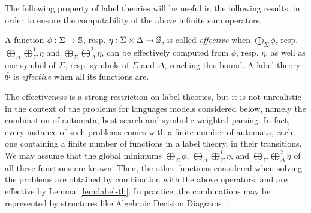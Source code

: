 



\noindent 
The following property of label theories will be useful in 
the following results, in order to ensure 
the computability of the above infinite sum operators.
%
\begin{definition}\label{def:effective}
A function $\phi: \Sigma \to \mathbb{S}$, 
resp. $\eta: \Sigma \times \Delta \to \mathbb{S}$,
is called \emph{effective} when 
$\bigoplus_{\Sigma} \phi$,
resp. $\bigoplus_{\Delta}\bigoplus^1_{\Sigma} \eta$ and $\bigoplus_{\Sigma}\bigoplus^2_{\Delta} \eta$,
can be effectively computed from $\phi$, resp. $\eta$, 
as well as one symbol of $\Sigma$, resp. symbols of $\Sigma$ and $\Delta$, 
reaching this bound.
%
A label theory $\bar\Phi$ is \emph{effective} when all its functions are.
\end{definition}

The effectiveness is a strong restriction on label theories, but it is
not unrealistic in the context of the problems for languages models considered below, 
namely the combination of automata, best-search and symbolic weighted parsing.
%
In fact, every instance of such problems comes with a finite number of automata, 
each one containing a finite number of functions in a label theory, in their transitions. 
We may assume that the global minimums $\bigoplus_{\Sigma} \phi$,
$\bigoplus_{\Delta}\bigoplus^1_{\Sigma} \eta$, and
$\bigoplus_{\Sigma}\bigoplus^2_{\Delta} \eta$
of all these functions are known.
%
Then, the other functions considered when solving the problems are obtained by combination with the above operators, and are effective by Lemma~\ref{lem:label-th}.
In practice, the combinations may be represented by structures like 
Algebraic Decision Diagrams~\cite{Bahar97ADD}.



